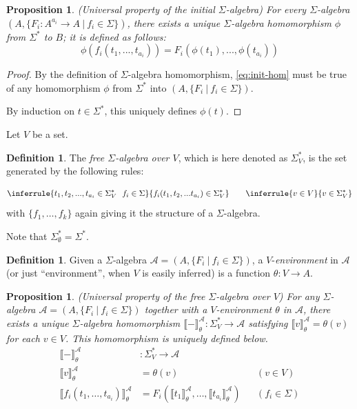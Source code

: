 \documentclass{msthesis}
\newtheorem{prop}[theorem]{Proposition}
\theoremstyle{definition}
\newtheorem{definition}[theorem]{Definition}
\newcommand{\semof}[1]{\llbracket{#1}\rrbracket}
\newcommand{\Amod}{\mathscr{A}}
\begin{document}
\begin{prop}
    (Universal property of the initial $\Sigma$-algebra) 
    For every $\Sigma$-algebra $(A, \{F_i : A^{a_i} \to A\ |\ f_i \in \Sigma\})$, there exists a unique $\Sigma$-algebra homomorphism $\phi$ from $\Sigma^*$ to $B$; it is defined as follows:
\begin{equation} \label{eq:init-hom}
\phi(f_i(t_1, ..., t_{a_i})) = F_i(\phi(t_1), ... , \phi(t_{a_i}))
\end{equation}
\end{prop}

\begin{proof}
    By the definition of $\Sigma$-algebra homomorphism, \eqref{eq:init-hom} must be true of any homomorphism $\phi$ from $\Sigma^*$ into $(A, \{F_i\ |\ f_i \in \Sigma\})$.
    
    By induction on $t \in \Sigma^*$, this uniquely defines $\phi(t)$.
\end{proof}

Let $V$ be a set.

\begin{definition}
    The \emph{free $\Sigma$-algebra over $V$}, which is here denoted as $\Sigma^*_V$, is the set generated by the following rules:

\[ \inferrule{
        t_1, t_2, ... , t_{a_i} \in \Sigma^*_V\ \ f_i \in \Sigma
    }{
        f_i(t_1, t_2, ... t_{a_i}) \in \Sigma^*_V
    }\qquad
    \inferrule{
        v \in V
    }{
        v \in \Sigma^*_V
    }
\]
\noindent
with $\{f_1,\dots,f_k\}$ again giving it the structure of a $\Sigma$-algebra. 
\end{definition}

Note that $\Sigma^*_\emptyset = \Sigma^*$.

\begin{definition}
    Given a $\Sigma$-algebra $\Amod = (A, \{F_i\ |\ f_i \in \Sigma\})$, a $V$-\emph{environment} in $\Amod$ (or just ``environment'', when $V$ is easily inferred) is a function $\theta : V \to A$.  
\end{definition}
\newcommand{\msL}{\mathscr{L}}
\begin{prop}
    (Universal property of the free $\Sigma$-algebra over $V$) For any $\Sigma$-algebra $\Amod=(A, \{F_i\ |\ f_i \in \Sigma\})$ together with a $V$-environment $\theta$ in $\mathscr{A}$, there exists a unique $\Sigma$-algebra homomorphism $\semof{-}_\theta^\Amod : \Sigma^*_V \to \Amod$ satisfying $\semof{v}_\theta^\Amod = \theta(v)$ for each $v \in V$. This homomorphism is uniquely defined below.
\begin{align*}
    \semof{-}_\theta^\Amod &: \Sigma^*_V \to \Amod \\
    \semof{v}_\theta^\Amod &= \theta(v) && (v \in V)\\
    \semof{f_i(t_1,\dots,t_{a_i})}_\theta^\Amod 
    &= F_i(\semof{t_1}_\theta^\Amod,\dots,\semof{t_{a_i}}_\theta^\Amod) && (f_i \in \Sigma)
\end{align*}
\end{prop}
\end{document}
